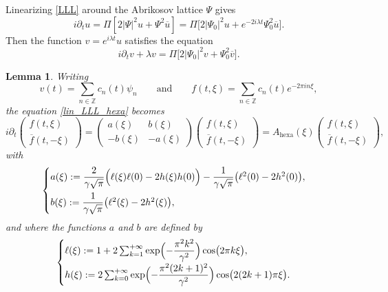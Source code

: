 \documentclass[JEP,XML,SOM,Unicode,NoFloatCountersInSection,published]{cedram}
\newtheorem{lemme}[theorem]{Lemma}
\theoremstyle{definition}
\let\EE\exp
\let\dis\relax
\let\ov\overline
\newcommand\Z{\mathbb Z}
\newcommand{\bpa}[1]{\bigl(#1\bigr)}
\newcommand{\pac}[1]{\left[#1\right]}
\newcommand{\bpac}[1]{\bigl[#1\bigr]}
\begin{document}
Linearizing \eqref{LLL} around the Abrikosov lattice $\Psi$ gives
\begin{equation}
i\partial_t u = \Pi\pac{2|\Psi|^2u+\Psi^2\ov{u}} = \Pi\bpac{2|\Psi_0|^2u+e^{-2i\lambda t}\Psi_0^2\ov{u}}.
\end{equation}
Then the function $v = e^{i\lambda t}u$ satisfies the equation
\begin{equation}\label{lin_LLL_hexa}
\tag{LLLhexa}
i\partial_t v + \lambda v = \Pi\bpac{2|\Psi_0|^2v+\Psi_0^2\ov{v}}.
\end{equation}

\begin{lemme}
\label{lemmaformula}
Writing\enlargethispage{-\baselineskip}
\[
v(t) = \sum_{n \in \Z} c_n(t) \psi_n \qquad \text{and} \qquad
f(t,\xi) = \sum_{n \in \Z} c_n(t) e^{-2\pi i n\xi},
\]
the equation \eqref{lin_LLL_hexa} becomes
\[
i \partial_t \begin{pmatrix} {f}(t,\xi) \\[3pt] \overline{{f}}(t,-\xi) \end{pmatrix} = \begin{pmatrix} a(\xi) & b(\xi) \\[3pt] -b(\xi) & -a(\xi) \end{pmatrix} \begin{pmatrix} {f}(t,\xi) \\[3pt] \overline{{f}}(t,-\xi) \end{pmatrix} = A_{\mathrm{hexa}}(\xi) \begin{pmatrix} {f}(t,\xi) \\[3pt] \overline{{f}}(t,-\xi) \end{pmatrix},
\]
with
\[
\begin{cases}
\dis a(\xi):= \dfrac{2}{\gamma\sqrt{\pi}}\Bigl({\ell(\xi)\ell(0)-2h(\xi)h(0)}\Bigr) - \dfrac{1}{\gamma\sqrt{\pi}}\bpa{\ell^2(0)-2h^2(0)}, \\[9pt]
\dis b(\xi):= \dfrac{1}{\gamma\sqrt{\pi}}\bpa{\ell^2(\xi)-2h^2(\xi)},
\end{cases}
\]
and where the functions $a$ and $b$ are defined by
\[
\begin{cases}
\dis \ell(\xi):= 1 + 2 \sum_{k=1}^{+\infty}\EE\Bigl(-\dfrac{\pi^2k^2}{\gamma^2}\Bigr)\cos\bigl({2\pi k\xi}\bigr), \\[6pt]
\dis h(\xi):= 2 \sum_{k=0}^{+\infty}\EE\Bigl(-\dfrac{\pi^2(2k+1)^2}{\gamma^2}\Bigr)\cos\bigl({2(2k+1)\pi \xi}\bigr).
\end{cases}
\]
\end{lemme}
\end{document}
